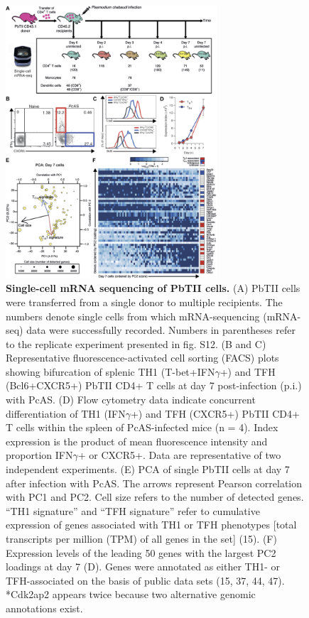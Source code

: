 \begin{figure}
    \centering
    \includegraphics[width=0.7\textwidth]{"Fig1"}
    \caption[Single-cell mRNA sequencing of PbTII cells]{\textbf{Single-cell mRNA sequencing of PbTII cells.} (A) PbTII cells were transferred from a single donor to multiple recipients. The numbers denote single cells from which mRNA-sequencing (mRNA-seq) data were successfully recorded. Numbers in parentheses refer to the replicate experiment presented in fig. S12. (B and C) Representative fluorescence-activated cell sorting (FACS) plots showing bifurcation of splenic TH1 (T-bet+IFN\( \gamma \)+) and TFH (Bcl6+CXCR5+) PbTII CD4+ T cells at day 7 post-infection (p.i.) with PcAS. (D) Flow cytometry data indicate concurrent differentiation of TH1 (IFN\( \gamma \)+) and TFH (CXCR5+) PbTII CD4+ T cells within the spleen of PcAS-infected mice (n = 4). Index expression is the product of mean fluorescence intensity and proportion IFN\( \gamma \)+ or CXCR5+. Data are representative of two independent experiments. (E) PCA of single PbTII cells at day 7 after infection with PcAS. The arrows represent Pearson correlation with PC1 and PC2. Cell size refers to the number of detected genes. “TH1 signature” and “TFH signature” refer to cumulative expression of genes associated with TH1 or TFH phenotypes [total transcripts per million (TPM) of all genes in the set] (15). (F) Expression levels of the leading 50 genes with the largest PC2 loadings at day 7 (D). Genes were annotated as either TH1- or TFH-associated on the basis of public data sets (15, 37, 44, 47). *Cdk2ap2 appears twice because two alternative genomic annotations exist.}
    \label{fig:timecourse}
\end{figure}



